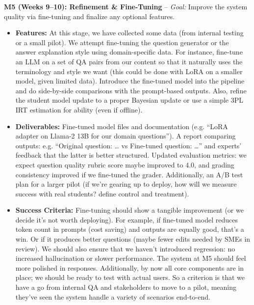 \documentclass[11pt]{article}
\begin{document}
\textbf{M5 (Weeks 9–10): Refinement \& Fine-Tuning} – \textit{Goal:} Improve the system quality via fine-tuning and finalize any optional features.
  \begin{itemize}
    \item \textbf{Features:} At this stage, we have collected some data (from internal testing or a small pilot). We attempt fine-tuning the question generator or the answer explanation style using domain-specific data. For instance, fine-tune an LLM on a set of QA pairs from our content so that it naturally uses the terminology and style we want (this could be done with LoRA on a smaller model, given limited data). Introduce the fine-tuned model into the pipeline and do side-by-side comparisons with the prompt-based outputs. Also, refine the student model update to a proper Bayesian update or use a simple 3PL IRT estimation for ability (even if offline).
    \item \textbf{Deliverables:} Fine-tuned model files and documentation (e.g. “LoRA adapter on Llama-2 13B for our domain questions”). A report comparing outputs: e.g. “Original question: … vs Fine-tuned question: …” and experts’ feedback that the latter is better structured. Updated evaluation metrics: we expect question quality rubric score maybe improved to 4.0, and grading consistency improved if we fine-tuned the grader. Additionally, an A/B test plan for a larger pilot (if we’re gearing up to deploy, how will we measure success with real students? define control and treatment).
    \item \textbf{Success Criteria:} Fine-tuning should show a tangible improvement (or we decide it’s not worth deploying). For example, if fine-tuned model reduces token count in prompts (cost saving) and outputs are equally good, that’s a win. Or if it produces better questions (maybe fewer edits needed by SMEs in review). We should also ensure that we haven’t introduced regression: no increased hallucination or slower performance. The system at M5 should feel more polished in responses. Additionally, by now all core components are in place; we should be ready to test with actual users. So a criterion is that we have a go from internal QA and stakeholders to move to a pilot, meaning they’ve seen the system handle a variety of scenarios end-to-end.
  \end{itemize}
\end{document}
